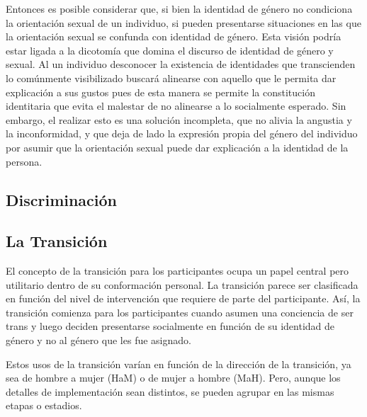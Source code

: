 Entonces es posible considerar que, si bien la identidad de género no condiciona
la orientación sexual de un individuo, si pueden presentarse situaciones en las
que la orientación sexual se confunda con identidad de género. Esta visión
podría estar ligada a la dicotomía que domina el discurso de identidad de género
y sexual. Al un individuo desconocer la existencia de identidades que
transcienden lo comúnmente visibilizado buscará alinearse con aquello que le
permita dar explicación a sus gustos pues de esta manera se permite la
constitución identitaria que evita el malestar de no alinearse a lo socialmente
esperado. Sin embargo, el realizar esto es una solución incompleta, que no
alivia la angustia y la inconformidad, y que deja de lado la expresión propia
del género del individuo por asumir que la orientación sexual puede dar
explicación a la identidad de la persona.

\subsection{Discriminación}
%
%
%
%
\subsection{La Transición}\label{ssec:transicion}

El concepto de la transición para los participantes ocupa un papel central pero
utilitario dentro de su conformación personal. La transición parece ser
clasificada en función del nivel de intervención que requiere de parte del
participante. Así, la transición comienza para los participantes cuando asumen
una conciencia de ser trans y luego deciden presentarse socialmente en función
de su identidad de género y no al género que les fue asignado.

Estos usos de la transición varían en función de la dirección de la transición,
ya sea de hombre a mujer (HaM) o de mujer a hombre (MaH). Pero, aunque los
detalles de implementación sean distintos, se pueden agrupar en las mismas
etapas o estadios.

